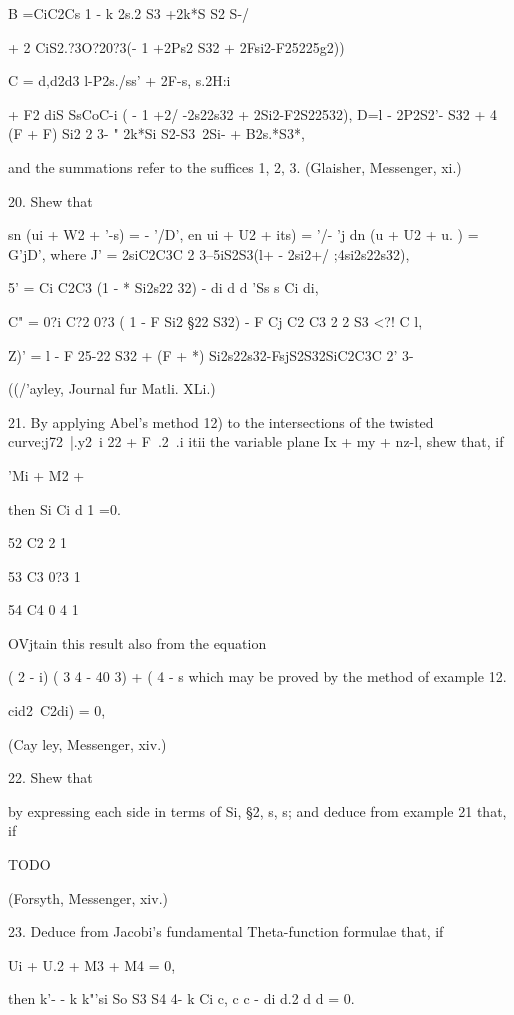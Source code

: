 B =CiC2Cs 1 - k 2s.2 S3 +2k*S S2 S-/

+ 2 CiS2.?3O?20?3(- 1 +2Ps2 S32 + 2Fsi2-F25225g2))

C = d,d2d3 l-P2s./ss' + 2F-s, s.2H:i

+ F2 diS SsCoC-i ( - 1 +2/ -2s22s32 + 2Si2-F2S22532), D=l - 2P2S2'-
S32 + 4 (F + F) Si2 2 3- " 2k*Si S2-S3~2Si- + B2s.*S3*,

and the summations refer to the suffices 1, 2, 3. (Glaisher,
Messenger, xi.)

20. Shew that

sn (ui + W2 + '-s) = - '/D', en ui + U2 + its) = '/- 'j dn (u + U2 +
u. ) = G'jD', where J' = 2siC2C3C 2 3--5iS2S3(l+ - 2si2+/
;4si2s22s32),

5' = Ci C2C3 (1 - * Si2s22 32) - di d d 'Ss s Ci di,

C" = 0?i C?2 0?3 ( 1 - F Si2 §22 S32) - F Cj C2 C3 2 2 S3 <?! C l,

Z)' = l - F 25-22 S32 + (F + *) Si2s22s32-FsjS2S32SiC2C3C 2' 3-

((/'ayley, Journal fur Matli. XLi.)

21. By applying Abel's method  12) to the intersections of the
twisted curve;j72\ |.y2\ i 22 + F\ .2\ .i itii the variable plane Ix
+ my + nz-l, shew that, if

'Mi + M2 + %

then Si Ci d 1 =0.

52 C2 2 1

53 C3 0?3 1

54 C4 0 4 1

OVjtain this result also from the equation

( 2 - i) ( 3 4 - 40 3) + ( 4 - s which may be proved by the method of
example 12.

 cid2~C2di) = 0,

(Cay ley, Messenger, xiv.)

%
%

22. Shew that

by expressing each side in terms of Si, §2, s, s; and deduce from
example 21 that, if

TODO

(Forsyth, Messenger, xiv.)

23. Deduce from Jacobi's fundamental Theta-function formulae that, if

Ui + U.2 + M3 + M4 = 0,

then k'- - k k"'si So S3 S4 4- k Ci c, c c - di d.2 d d = 0.

